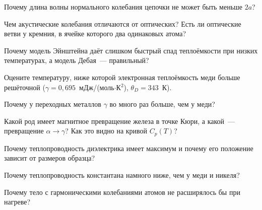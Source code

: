 \begin{proverka}
\item Почему длина волны нормального колебания цепочки не может быть
меньше $2a$?
\item Чем акустические колебания отличаются от оптических? Есть ли
оптические ветви у кремния, в ячейке которого два одинаковых атома?
\item Почему модель Эйнштейна даёт слишком быстрый спад теплоёмкости при
низких температурах, а модель Дебая~— правильный?
\item Оцените температуру, ниже которой электронная теплоёмкость меди
больше решёточной ($\gamma=0{,}695$~мДж/(моль$\cdot$К$^2$), $\theta_D=343$~К).
\item Почему у переходных металлов $\gamma$ во много раз больше, чем у меди?
\item Какой род имеет магнитное превращение железа в точке Кюри, а какой~—
превращение $\alpha\to\gamma$? Как это видно на кривой $C_p(T)$?
\item Почему теплопроводность диэлектрика имеет максимум и почему его
положение зависит от размеров образца?
\item Почему теплопроводность константана намного ниже, чем у меди и
никеля?
\item Почему тело с гармоническими колебаниями атомов не расширялось бы
при нагреве?
\end{proverka}
